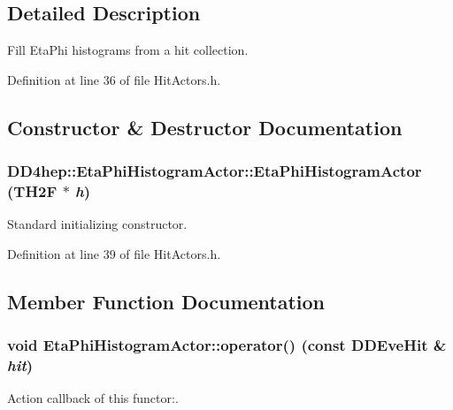 \subsection{Detailed Description}
Fill EtaPhi histograms from a hit collection. 

Definition at line 36 of file HitActors.h.

\subsection{Constructor \& Destructor Documentation}
\hypertarget{struct_d_d4hep_1_1_eta_phi_histogram_actor_a241688f10ff3ad7002b0403a84a8609e}{
\subsubsection[{EtaPhiHistogramActor}]{\setlength{\rightskip}{0pt plus 5cm}DD4hep::EtaPhiHistogramActor::EtaPhiHistogramActor (TH2F $\ast$ {\em h})}}
\label{struct_d_d4hep_1_1_eta_phi_histogram_actor_a241688f10ff3ad7002b0403a84a8609e}


Standard initializing constructor. 

Definition at line 39 of file HitActors.h.

\subsection{Member Function Documentation}
\hypertarget{struct_d_d4hep_1_1_eta_phi_histogram_actor_ae0ab6bd1064a336f7cb3f1592a70e063}{
\subsubsection[{operator()}]{\setlength{\rightskip}{0pt plus 5cm}void EtaPhiHistogramActor::operator() (const {\bf DDEveHit} \& {\em hit})}}
\label{struct_d_d4hep_1_1_eta_phi_histogram_actor_ae0ab6bd1064a336f7cb3f1592a70e063}


Action callback of this functor:. 

